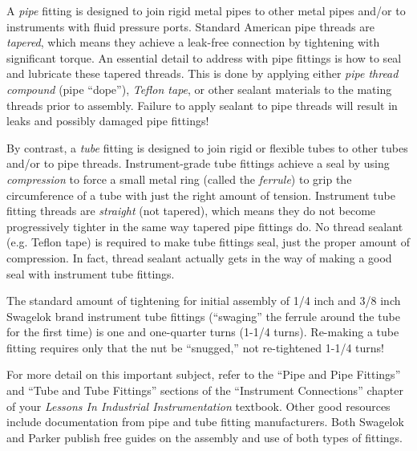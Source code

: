 \vskip 10pt

A {\it pipe} fitting is designed to join rigid metal pipes to other metal pipes and/or to instruments with fluid pressure ports.  Standard American pipe threads are {\it tapered}, which means they achieve a leak-free connection by tightening with significant torque.  An essential detail to address with pipe fittings is how to seal and lubricate these tapered threads.  This is done by applying either {\it pipe thread compound} (pipe ``dope''), {\it Teflon tape}, or other sealant materials to the mating threads prior to assembly.  Failure to apply sealant to pipe threads will result in leaks and possibly damaged pipe fittings!

\vskip 10pt

By contrast, a {\it tube} fitting is designed to join rigid or flexible tubes to other tubes and/or to pipe threads.  Instrument-grade tube fittings achieve a seal by using {\it compression} to force a small metal ring (called the {\it ferrule}) to grip the circumference of a tube with just the right amount of tension.  Instrument tube fitting threads are {\it straight} (not tapered), which means they do not become progressively tighter in the same way tapered pipe fittings do.  No thread sealant (e.g. Teflon tape) is required to make tube fittings seal, just the proper amount of compression.  In fact, thread sealant actually gets in the way of making a good seal with instrument tube fittings.  

The standard amount of tightening for initial assembly of 1/4 inch and 3/8 inch Swagelok brand instrument tube fittings (``swaging'' the ferrule around the tube for the first time) is one and one-quarter turns (1-1/4 turns).  Re-making a tube fitting requires only that the nut be ``snugged,'' not re-tightened 1-1/4 turns!

\vskip 10pt

For more detail on this important subject, refer to the ``Pipe and Pipe Fittings'' and ``Tube and Tube Fittings'' sections of the ``Instrument Connections'' chapter of your {\it Lessons In Industrial Instrumentation} textbook.  Other good resources include documentation from pipe and tube fitting manufacturers.  Both Swagelok and Parker publish free guides on the assembly and use of both types of fittings.










\vfil \eject

